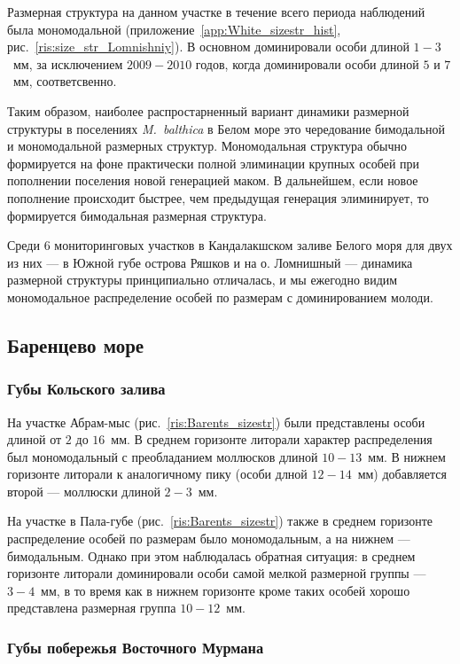 Размерная структура на данном участке в течение всего периода наблюдений была мономодальной (приложение~\ref{app:White_sizestr_hist}, рис.~\ref{ris:size_str_Lomnishniy}).
В основном доминировали особи длиной $1-3$~мм, за исключением $2009-2010$ годов, когда доминировали особи длиной $5$ и $7$~мм, соответсвенно.


\bigskip
Таким образом, наиболее распростарненный вариант динамики размерной структуры в поселениях {\it M.~balthica} в Белом море это чередование бимодальной и мономодальной размерных структур.
Мономодальная структура обычно формируется на фоне практически полной элиминации крупных особей при пополнении поселения новой генерацией маком.
В дальнейшем, если новое пополнение происходит быстрее, чем предыдущая генерация элиминирует, то формируется бимодальная размерная структура.

Среди 6 мониторинговых участков в Кандалакшском заливе Белого моря для двух из них --- в Южной губе острова Ряшков и на о. Ломнишный --- динамика размерной структуры принципиально отличалась, и мы ежегодно видим мономодальное распределение особей по размерам с доминированием молоди.

\afterpage{\clearpage}

		\subsection{Баренцево море}

		\subsubsection{Губы Кольского залива}

На участке Абрам-мыс (рис.~\ref{ris:Barents_sizestr}) были представлены особи длиной от $2$ до $16$~мм. 
В среднем горизонте литорали характер распределения был мономодальный с преобладанием моллюсков длиной $10-13$~мм. 
В нижнем горизонте литорали к аналогичному пику (особи длной $12-14$~мм) добавляется второй — моллюски длиной $2-3$~мм.

На участке в Пала-губе (рис.~\ref{ris:Barents_sizestr}) также в среднем горизонте распределение особей по размерам было мономодальным, а на нижнем --- бимодальным. 
Однако при этом наблюдалась обратная ситуация: в среднем горизонте литорали доминировали особи самой мелкой размерной группы --- $3-4$~мм, в то время как  в нижнем горизонте кроме таких особей  хорошо представлена размерная группа $10-12$~мм.

		\subsubsection{Губы побережья Восточного Мурмана}

